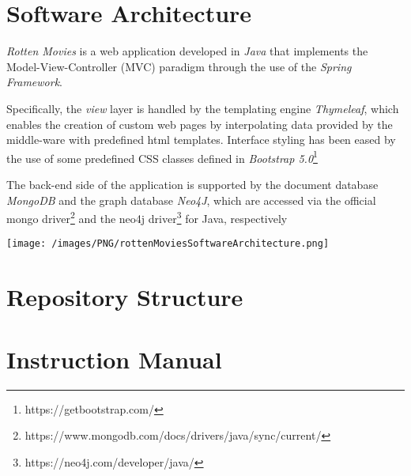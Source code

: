 


\chapter{Software Architecture}
\emph{Rotten Movies} is a web application developed in \emph{Java} that implements the Model-View-Controller (MVC) paradigm through
the use of the \emph{Spring Framework}. 

Specifically, the \emph{view} layer is handled by the templating engine \emph{Thymeleaf}, 
which enables the creation of custom web pages by interpolating data provided by the middle-ware with predefined html templates.
Interface styling has been eased by the use of some predefined CSS classes defined in \emph{Bootstrap 5.0}\footnote{https://getbootstrap.com/}

The back-end side of the application is supported by the document database \emph{MongoDB} and the graph database \emph{Neo4J}, 
which are accessed via the official mongo driver\footnote{https://www.mongodb.com/docs/drivers/java/sync/current/} and the 
neo4j driver\footnote{https://neo4j.com/developer/java/} for Java, respectively

\hspace{2em}

\texttt{[image: /images/PNG/rottenMoviesSoftwareArchitecture.png]}

\chapter{Repository Structure}

\chapter{Instruction Manual}

